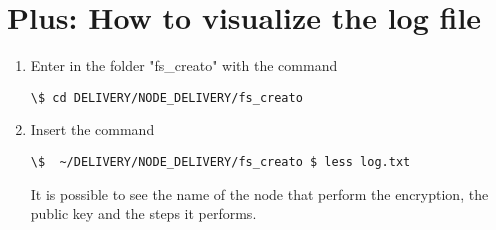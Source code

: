 \section{Plus: How to visualize the log file}
\begin{enumerate}
\item Enter in the folder "fs\_creato" with the command  \begin{verbatim}\$ cd DELIVERY/NODE_DELIVERY/fs_creato\end{verbatim}
\item Insert the command \begin{verbatim}\$  ~/DELIVERY/NODE_DELIVERY/fs_creato $ less log.txt\end{verbatim} 
It is possible to see the name of the node that perform the encryption, the public key and the steps it performs.
\end{enumerate}



